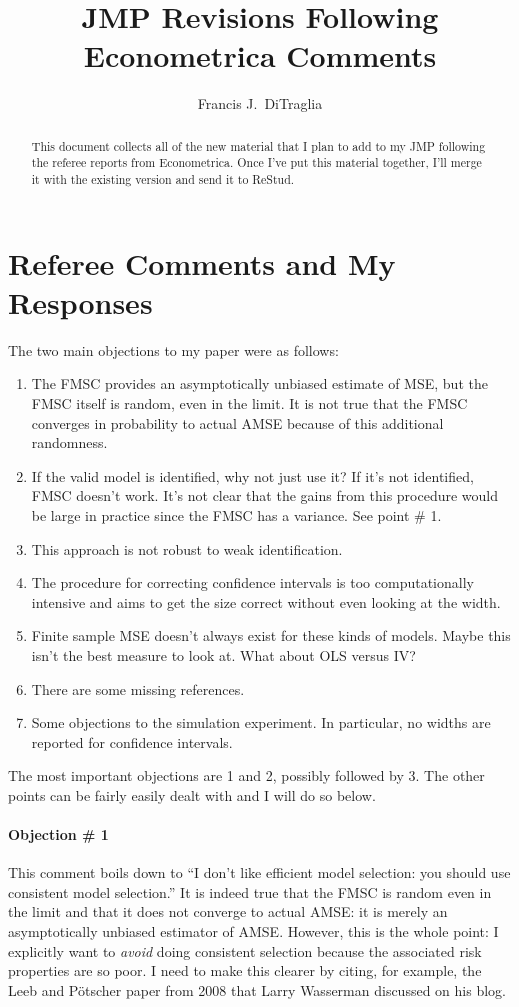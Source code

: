 \documentclass[12pt]{article}
\title{JMP Revisions Following Econometrica Comments}
\author{Francis J.\ DiTraglia}
\theoremstyle{definition}
\begin{document}
\maketitle

\begin{abstract}
This document collects all of the new material that I plan to add to my JMP following the referee reports from Econometrica. Once I've put this material together, I'll merge it with the existing version and send it to ReStud.
\end{abstract}

\section*{Referee Comments and My Responses}
The two main objections to my paper were as follows:
  \begin{enumerate}
    \item The FMSC provides an asymptotically unbiased estimate of MSE, but the FMSC itself is random, even in the limit. It is not true that the FMSC converges in probability to actual AMSE because of this additional randomness. 
    \item If the valid model is identified, why not just use it? If it's not identified, FMSC doesn't work. It's not clear that the gains from this procedure would be large in practice since the FMSC has a variance. See point \# 1. 
    \item This approach is not robust to weak identification.
    \item The procedure for correcting confidence intervals is too computationally intensive and aims to get the size correct without even looking at the width.
    \item Finite sample MSE doesn't always exist for these kinds of models. Maybe this isn't the best measure to look at.
    What about OLS versus IV?
    \item There are some missing references.
    \item Some objections to the simulation experiment. In particular, no widths are reported for confidence intervals.
  \end{enumerate}
The most important objections are 1 and 2, possibly followed by 3. The other points can be fairly easily dealt with and I will do so below. 

\paragraph{Objection \# 1} This comment boils down to ``I don't like efficient model selection: you should use consistent model selection.'' It is indeed true that the FMSC is random even in the limit and that it does not converge to actual AMSE: it is merely an asymptotically unbiased estimator of AMSE. However, this is the whole point: I explicitly want to \emph{avoid} doing consistent selection because the associated risk properties are so poor. I need to make this clearer by citing, for example, the Leeb and P\"{o}tscher paper from 2008 that Larry Wasserman discussed on his blog.
\end{document}

